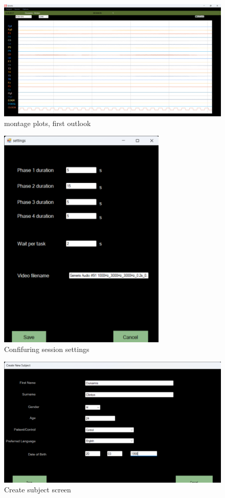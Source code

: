 \documentclass[10pt]{article}
\begin{document}
\begin{figure}[H]
  \centering
  \includegraphics[width=13cm]{images/daqScreen.png}
  \caption{montage plots, first outlook}
  \label{fig:acquisitionScreen}
\end{figure}
\begin{figure}[H]
  \centering
  \includegraphics[width=8cm]{images/SessionParamsScreen.png}
  \caption{Confifuring session settings}
  \label{fig:paramsSreen}
\end{figure}
\begin{figure}[H]
  \centering
  \includegraphics{images/CreateSubjectScreen.resized.png}
  \caption{Create subject screen}
  \label{fig:subjectCreate}
\end{figure}
\end{document}
